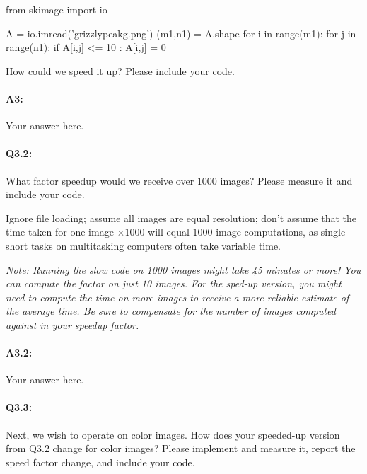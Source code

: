 \documentclass[11pt]{article}
\begin{document}
\begin{python}
from skimage import io

A = io.imread('grizzlypeakg.png')
(m1,n1) = A.shape
for i in range(m1):
    for j in range(n1):
        if A[i,j] <= 10 :
            A[i,j] = 0       
\end{python}

How could we speed it up? Please include your code. \\

\paragraph{A3:} Your answer here.




\pagebreak
\paragraph{Q3.2:} What factor speedup would we receive over 1000 images? Please measure it and include your code.

Ignore file loading; assume all images are equal resolution; don't assume that the time taken for one image $\times1000$ will equal $1000$ image computations, as single short tasks on multitasking computers often take variable time.

\emph{Note: Running the slow code on 1000 images might take 45 minutes or more! You can compute the factor on just 10 images. For the sped-up version, you might need to compute the time on more images to receive a more reliable estimate of the average time. Be sure to compensate for the number of images computed against in your speedup factor.}

\paragraph{A3.2:} Your answer here.




\pagebreak
\paragraph{Q3.3:} Next, we wish to operate on color images. How does your speeded-up version from Q3.2 change for color images? Please implement and measure it, report the speed factor change, and include your code.
\end{document}
